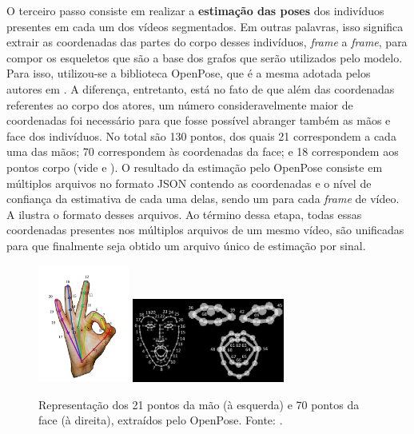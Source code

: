 O terceiro passo consiste em realizar a \textbf{estimação das poses} dos indivíduos presentes em cada um dos vídeos segmentados. Em outras palavras, isso significa extrair as coordenadas das partes do corpo desses indivíduos, \textit{frame} a \textit{frame}, para compor os esqueletos que são a base dos grafos que serão utilizados pelo modelo. Para isso, utilizou-se a biblioteca OpenPose, que é a mesma adotada pelos autores em \cite{st-gcn-2018}. A diferença, entretanto, está no fato de que além das coordenadas referentes ao corpo dos atores, um número consideravelmente maior de coordenadas foi necessário para que fosse possível abranger também as mãos e face dos indivíduos. No total são 130 pontos, dos quais 21 correspondem a cada uma das mãos; 70 correspondem às coordenadas da face; e 18 correspondem aos pontos corpo (vide  e ). O resultado da estimação pelo OpenPose consiste em múltiplos arquivos no formato JSON contendo as coordenadas e o nível de confiança da estimativa de cada uma delas, sendo um para cada \textit{frame} de vídeo. A  ilustra o formato desses arquivos. Ao término dessa etapa, todas essas coordenadas presentes nos múltiplos arquivos de um mesmo vídeo, são unificadas para que finalmente seja obtido um arquivo único de estimação por sinal.

\begin{figure}[ht]
    \centering
    \includegraphics[width=3cm]{images/keypoints_hand}
    \includegraphics[width=5cm]{images/keypoints_face}
    \caption{Representação dos 21 pontos da mão (à esquerda) e 70 pontos da face (à direita), extraídos pelo OpenPose. Fonte: \cite{openpose-output-2018}.}
    \label{fig:keypoints-face-hand}
\end{figure}

